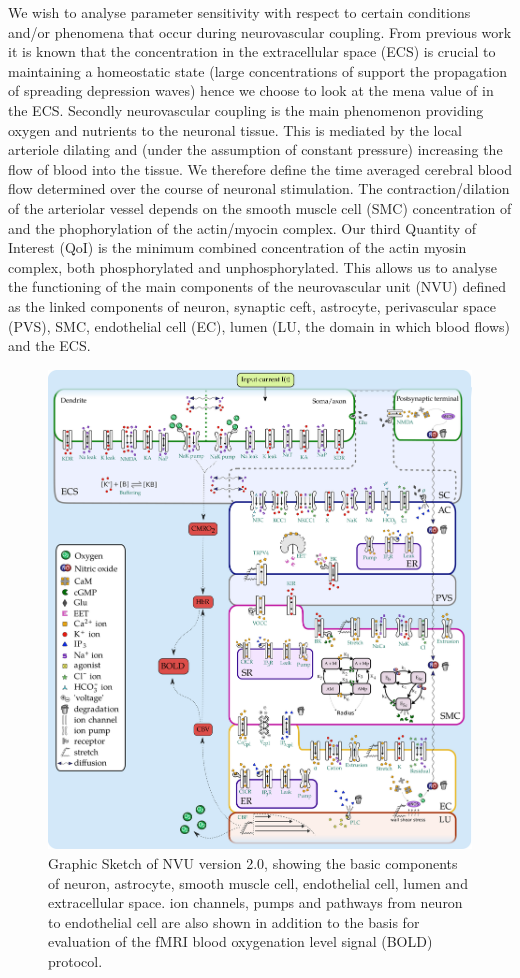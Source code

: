 We wish to analyse parameter sensitivity with respect to certain conditions and/or phenomena that occur during neurovascular coupling. From previous work it is known that the \pot concentration in the extracellular space (ECS) is crucial to maintaining a homeostatic state (large concentrations of \pot support the propagation of spreading depression waves) hence we choose to look at the mena value of \pot in the ECS. Secondly neurovascular coupling is the main phenomenon providing oxygen and nutrients to the neuronal tissue. This is mediated by the local arteriole dilating and (under the assumption of constant pressure) increasing the flow of blood into the tissue. We therefore define the time averaged cerebral blood flow determined over the course of neuronal stimulation. The contraction/dilation of the arteriolar vessel  depends on the smooth muscle cell (SMC) concentration of \ca and the phophorylation of the actin/myocin complex. Our third Quantity of Interest (QoI) is the minimum combined concentration of the actin myosin complex, both phosphorylated and unphosphorylated. This allows us to analyse the functioning of the main components of the neurovascular unit (NVU) defined as the linked components of neuron, synaptic ceft, astrocyte, perivascular space (PVS), SMC, endothelial cell (EC), lumen (LU, the domain in which blood flows) and the ECS. 

\begin{figure}[h!]
\centering
\includegraphics[width=0.7\linewidth]{Figures/nvu_20}
\caption[Graphic Sketch of NVU version 2.0]{Graphic Sketch of NVU version 2.0, showing the basic components of neuron, astrocyte, smooth muscle cell, endothelial cell, lumen and extracellular space. ion channels, pumps and pathways from neuron to endothelial cell are also shown in addition to the basis for evaluation of the fMRI blood oxygenation level signal (BOLD) protocol.}
\label{fig:nvu20}
\end{figure}

